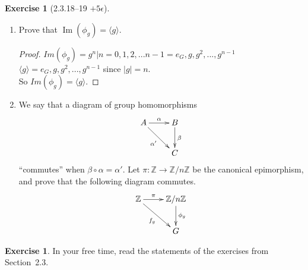 \documentclass{amsart}
\newcommand{\bbz}{\mathbb{Z}}
\newcommand{\im}{\operatorname{Im}}
\theoremstyle{plain}
\theoremstyle{definition}
\newtheorem{exer}[lem]{Exercise}
\begin{document}
\begin{exer}[2.3.18--19 $+5\epsilon$]
\begin{enumerate}[(a)]
\begin{enumerate}[(1)]
\item Prove that $\im(\phi_g)=\langle g\rangle$.
	\begin{proof}
		$Im(\phi_g) = {g^n| n = 0,1,2,...n - 1} = {e_G, g,g^2,...,g^{n-1}} $\\
		$\langle g \rangle ={e_G, g,g^2,...,g^{n-1}}$ since $|g| = n$.\\
		So $Im(\phi_g) = \langle g \rangle$.
	\end{proof}
\item We say that a diagram 
of group homomorphisms
$$\xymatrix{A\ar[r]^-\alpha\ar[rd]_{\alpha'}&B\ar[d]^\beta \\ & C}$$
``commutes'' when $\beta\circ\alpha=\alpha'$.
Let $\pi\colon \bbz\to\bbz/n\bbz$ be the canonical epimorphism, and prove that the following diagram commutes.
$$\xymatrix{\bbz\ar[r]^-{\pi}\ar[rd]_{f_g}&\bbz/n\bbz\ar[d]^{\phi_g} \\ & G}$$

\end{enumerate}
\end{enumerate}
\end{exer}


\begin{exer}
In your free time, read the statements of the  exercises from Section~2.3.
\end{exer}
\end{document}
